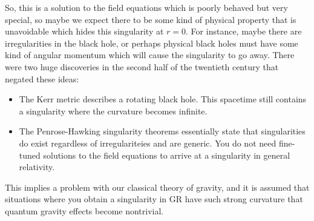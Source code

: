 \documentclass[11pt,table]{article}
\begin{document}
            So, this is a solution to the field equations which is poorly behaved but very special, so maybe we expect there to be some kind of physical property that is unavoidable which hides this singularity at $r=0$.  For instance, maybe there are irregularities in the black hole, or perhaps physical black holes must have some kind of angular momentum which will cause the singularity to go away.  There were two huge discoveries in the second half of the twentieth century that negated these ideas:
            \begin{itemize}
                \item The Kerr metric describes a rotating black hole.  This spacetime still contains a singularity where the curvature becomes infinite.
                \newpage
                \item The Penrose-Hawking singularity theorems essentially state that singularities do exist regardless of irregulariteies and are generic.  You do not need fine-tuned solutions to the field equations to arrive at a singularity in general relativity.
            \end{itemize} 
            This implies a problem with our classical theory of gravity, and it is assumed that situations where you obtain a singularity in GR have such strong curvature that quantum gravity effects become nontrivial.
\end{document}
